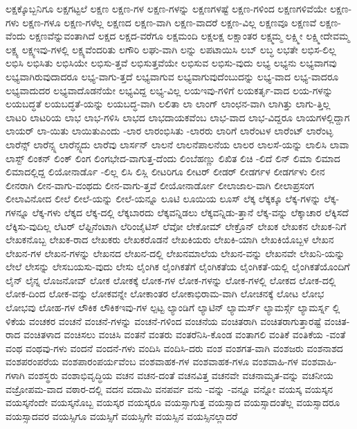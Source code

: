 {ಲಕ್ಷಕ್ಕೊಬ್ಬನಿಗೂ
ಲಕ್ಷಗಟ್ಟಲೆ
ಲಕ್ಷಣ
ಲಕ್ಷಣ-ಗಳ
ಲಕ್ಷಣ-ಗಳನ್ನು
ಲಕ್ಷಣಗಳಷ್ಟೆ
ಲಕ್ಷಣ-ಗಳಿಂದ
ಲಕ್ಷಣಗಳಿವೆಯೇ
ಲಕ್ಷಣ-ಗಳು
ಲಕ್ಷಣ-ಗಳೂ
ಲಕ್ಷಣ-ಗಳೆಲ್ಲ
ಲಕ್ಷಣದ
ಲಕ್ಷಣ-ವಾಗಿ
ಲಕ್ಷಣ-ವಾದರೆ
ಲಕ್ಷಣ-ವಿಲ್ಲ
ಲಕ್ಷಣವೂ
ಲಕ್ಷಣವೆ
ಲಕ್ಷಣ-ವೆಂದು
ಲಕ್ಷಣವೆನ್ನುವಂತಾಗಿದೆ
ಲಕ್ಷದ
ಲಕ್ಷದ-ವರೆಗೂ
ಲಕ್ಷಮಂದಿ
ಲಕ್ಷಲಕ್ಷ
ಲಕ್ಷಾಂತರ
ಲಕ್ಷ್ಮಮ್ಮ
ಲಕ್ಷ್ಮೀ
ಲಕ್ಷ್ಮೀದೇವಮ್ಮ
ಲಕ್ಷ್ಯ
ಲಕ್ಷ್ಯಇವು-ಗಳಲ್ಲಿ
ಲಕ್ಷ್ಯವೆಂದರಿತು
ಲಗೌರಿ
ಲಘು-ವಾಗಿ
ಲನ್ನು
ಲಪಟಾಯಿಸಿ
ಲಬ್
ಲಬ್ಧ
ಲಭತೇ
ಲಭಿಸ-ಲಿಲ್ಲ
ಲಭಿಸಿ
ಲಭಿಸಿತು
ಲಭಿಸಿಯೇ
ಲಭಿಸು-ತ್ತವೆ
ಲಭಿಸುತ್ತವೆಯೇ
ಲಭಿಸುವ
ಲಭಿಸು-ವುದು
ಲಭ್ಯ
ಲಭ್ಯನು
ಲಭ್ಯವಾಗವು
ಲಭ್ಯವಾಗಿರುವುದಾದರೂ
ಲಭ್ಯ-ವಾಗು-ತ್ತದೆ
ಲಭ್ಯವಾಗುವ
ಲಭ್ಯವಾಗುವುದೆಂಬುದನ್ನು
ಲಭ್ಯ-ವಾದ
ಲಭ್ಯ-ವಾದರೂ
ಲಭ್ಯವಾದುದರ
ಲಭ್ಯವಾದೊಡನೆಯೇ
ಲಭ್ಯವಿದ್ದ
ಲಭ್ಯ-ವಿಲ್ಲ
ಲಯಇವು-ಗಳಿಗೆ
ಲಯಕರ್ತೃ-ವಾದ
ಲಯ-ಗಳನ್ನು
ಲಯಬದ್ಧತೆ
ಲಯಬದ್ಧತೆ-ಯನ್ನು
ಲಯಬದ್ಧ-ವಾಗಿ
ಲಲಿತಾ
ಲಾ
ಲಾಂಗ್
ಲಾಂಛನ-ವಾಗಿ
ಲಾಗಿತ್ತು
ಲಾಗು-ತ್ತಿಲ್ಲ
ಲಾಟರಿ
ಲಾಟರಿಯ
ಲಾಭ
ಲಾಭ-ಗಳಿಸಿ
ಲಾಭದ
ಲಾಭದಾಯಕವೆಂಬ
ಲಾಭ-ವಾದ
ಲಾಭ-ವಿದ್ದರೂ
ಲಾಯಗಳಲ್ಲಿದ್ದಾಗ
ಲಾಯರ್
ಲಾ-ಯಿತು
ಲಾಯಿತುಎಂದು
-ಲಾರ
ಲಾರಂಭಿಸಿತು
-ಲಾರರು
ಲಾರಿಗೆ
ಲಾರೆಂಟಳ
ಲಾರೆಂಟ್
ಲಾರೆಂಟ್ಳ
ಲಾರೆನ್ಸ್
ಲಾರೆನ್ಸ್ನ
ಲಾರೆನ್ಸ್ನದು
ಲಾರೆವು
ಲಾರ್ಸನ್
ಲಾಲನೆ
ಲಾಲನೆಪಾಲನೆಯ
ಲಾಲರ
ಲಾಲಸೆ-ಯನ್ನು
ಲಾಲಿಸಿ
ಲಾವಾ
ಲಾಸ್ಟ್
ಲಿಂಕನ್
ಲಿಂಕ್
ಲಿಂಗ
ಲಿಂಗಭೇದ-ವಾಗುತ್ತ-ದೆಂದು
ಲಿಂಬೆಹಣ್ಣು
ಲಿಖಿತ
ಲಿಚಿ
-ಲಿದೆ
ಲಿನ್
ಲಿಮಾ
ಲಿಮಾದ
ಲಿಮಾದಲ್ಲಿದ್ದ
ಲಿಯೋನಾರ್ಡೊ
-ಲಿಲ್ಲ
ಲಿಸಿ
ಲಿಸ್ಲಿ
ಲೀಟರಿಗೂ
ಲೀಟರ್
ಲೀಡರ್
ಲೀಡರ್ಗಳ
ಲೀಡರ್ಗಳು
ಲೀನ
ಲೀನರಾಗಿ
ಲೀನ-ವಾಗು-ವಂಥದು
ಲೀನ-ವಾಗು-ತ್ತವೆ
ಲೀಯೋನಾರ್ಡೋ
ಲೀಲಾಜಾಲ-ವಾಗಿ
ಲೀಲಾಪ್ರಸಂಗ
ಲೀಲಾವಿನೋದ
ಲೀಲೆ
ಲೀಲೆ-ಯನ್ನು
ಲೀಲೆ-ಯನ್ನೂ
ಲೂಟಿ
ಲೂಯಿಯ
ಲೂಸ್
ಲೆಕ್ಕ
ಲೆಕ್ಕಕ್ಕೂ
ಲೆಕ್ಕ-ಗಳನ್ನು
ಲೆಕ್ಕ-ಗಳನ್ನೂ
ಲೆಕ್ಕ-ಗಳು
ಲೆಕ್ಕದ
ಲೆಕ್ಕ-ದಲ್ಲಿ
ಲೆಕ್ಕಬಾರದು
ಲೆಕ್ಕವನ್ನಿಡಲು
ಲೆಕ್ಕವನ್ನಿಡು-ತ್ತಾನೆ
ಲೆಕ್ಕ-ವನ್ನು
ಲೆಕ್ಕಾಚಾರ
ಲೆಕ್ಕಿಸದೆ
ಲೆಕ್ಕಿಸು-ವುದಿಲ್ಲ
ಲೆಟರ್
ಲೆಫ್ಟಿನೆಂಟಾಗಿ
ಲೆರಿಂಜೈಟಿಸ್
ಲೆವೋ
ಲೇಕೋಮ್
ಲೇಕ್ರೊನ್
ಲೇಖಕ
ಲೇಖಕನ
ಲೇಖಕ-ನಿಗೆ
ಲೇಖಕನೊಬ್ಬ
ಲೇಖಕ-ರಾದ
ಲೇಖಕರು
ಲೇಖಕರೊಡನೆ
ಲೇಖಕಿಯರು
ಲೇಖಕಿ-ಯಾಗಿ
ಲೇಖಕಿಯೊಬ್ಬಳ
ಲೇಖನ
ಲೇಖನ-ಗಳ
ಲೇಖನ-ಗಳನ್ನು
ಲೇಖನದ
ಲೇಖನ-ದಲ್ಲಿ
ಲೇಖನಮಾಲೆಯ
ಲೇಖನ-ವನ್ನು
ಲೇಖನವೇ
ಲೇಖನಿ-ಯನ್ನು
ಲೇಲೆ
ಲೇಸನ್ನು
ಲೇಸಬಯಸು-ವುದು
ಲೇಸು
ಲೈಂಗಿಕ
ಲೈಂಗಿಕತೆಗೆ
ಲೈಂಗಿಕತೆಯ
ಲೈಂಗಿಕತೆ-ಯಲ್ಲಿ
ಲೈಂಗಿಕತೆಯೊಂದಿಗೆ
ಲೈನ್
ಲೈನ್ನ
ಲೊಜನೋವ್
ಲೋಕ
ಲೋಕಕ್ಕೆ
ಲೋಕ-ಗಳ
ಲೋಕ-ಗಳನ್ನು
ಲೋಕ-ಗಳಲ್ಲಿ
ಲೋಕದ
ಲೋಕ-ದಲ್ಲಿ
ಲೋಕ-ದಿಂದ
ಲೋಕ-ವನ್ನು
ಲೋಕವನ್ನೇ
ಲೋಕಾಂತರ
ಲೋಕಾಭಿರಾಮ-ವಾಗಿ
ಲೋಚನಕ್ಕೆ
ಲೋಟ
ಲೋಭ
ಲೋಭವು
ಲೋಹ-ಗಳ
ಲೌಕಿಕ
ಲೌಕಿಕಇವು-ಗಳ
ಲ್ಪಟ್ಟ
ಲ್ಯಾಂಡಿಗೆ
ಲ್ಯಾಟಿನ್
ಲ್ಯಾಮರ್ಸ್
ಲ್ಯಾಮರ್ಸ್ಗೆ
ಲ್ಯಾಮರ್ಸ್ನ
ಲ್ಲಿ
ಳಿಕೆಯ
ವಂಚಕರ
ವಂಚನೆ
ವಂಚನೆ-ಗಳನ್ನು
ವಂಚನೆ-ಗಳಿಂದ
ವಂಚನೆಯ
ವಂಚಿತರಾಗಿ
ವಂಚಿತರಾಗುತ್ತಾರಷ್ಟೆ
ವಂಚಿತ-ರಾದ
ವಂಚಿತಳಾದ
ವಂಚಿಸಲು
ವಂಚಿಸಿ
ವಂತನೆ
ವಂತರು
ವಂತರೆನಿಸಿ-ಕೊಂಡ
ವಂತಾಗಲಿ
ವಂತಿಕೆ
ವಂತಿಕೆಯ
-ವಂತೆ
ವಂಥ
ವಂಥವು-ಗಳು
ವಂದನೆ
ವಂದನೆ-ಗಳು
ವಂದಿಸಿ
ವಂದಿಸಿ-ದರು
ವಂಶ
ವಂಶಗತ-ವಾಗಿ
ವಂಶಜರು
ವಂಶನಾಶದ
ವಂಶಪರಂಪರೆಯ
ವಂಶಪಾರಂಪರ್ಯವೆಂಬ
ವಂಶವಾಹಕ-ಗಳ
ವಂಶವಾಹಕ-ಗಳೂ
ವಂಶವಾಹಿ-ಗಳ
ವಂಶವಾಹಿ-ಗಳಾಗಿ
ವಂಶಸ್ಥರು
ವಂಶಾಭಿವೃದ್ಧಿಯ
ವಚನ
ವಚನ-ದಂತೆ
ವಚನವಿತ್ತ
ವಚನವೇ
ವಚನಾಮೃತ-ವನ್ನು
ವಚನೀಯ
ವಜ್ರೋಪಮ-ವಾದ
ವಠಾರ-ದಲ್ಲಿ
ವದನ
ವದಾಮಿ
ವನಪರ್ವ
ವನು
-ವನ್ನು
-ವನ್ನೂ
ವನ್ನೋ
ವಯಸ್ಕ
ವಯಸ್ಕನ
ವಯಸ್ಕನೆಂದೇ
ವಯಸ್ಕನೊಬ್ಬ
ವಯಸ್ಕರ
ವಯಸ್ಕರೂ
ವಯಸ್ಸಾಗುತ್ತ
ವಯಸ್ಸಾದ
ವಯಸ್ಸಾದಂತೆಲ್ಲ
ವಯಸ್ಸಾದರೂ
ವಯಸ್ಸಾದವರ
ವಯಸ್ಸಿಗೂ
ವಯಸ್ಸಿಗೆ
ವಯಸ್ಸಿಗೇ
ವಯಸ್ಸಿನ
ವಯಸ್ಸಿನಲ್ಲಾದರೆ
}

